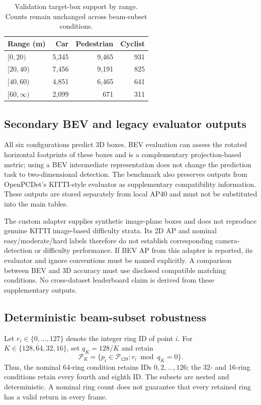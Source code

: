 \documentclass[10pt,twocolumn]{article}
\begin{document}
\begin{table}[t]
\centering\small
\caption{Validation target-box support by range. Counts remain unchanged across beam-subset conditions.}
\label{tab:support}
\begin{tabular}{lrrr}
\toprule
Range (m) & Car & Pedestrian & Cyclist\\
\midrule
$[0,20)$ & 5,345 & 9,465 & 931\\
$[20,40)$ & 7,456 & 9,191 & 825\\
$[40,60)$ & 4,851 & 6,465 & 641\\
$[60,\infty)$ & 2,099 & 671 & 311\\
\bottomrule
\end{tabular}
\end{table}

\subsection{Secondary BEV and legacy evaluator outputs}
All six configurations predict 3D boxes. BEV evaluation can assess the rotated horizontal footprints of these boxes and is a complementary projection-based metric; using a BEV intermediate representation does not change the prediction task to two-dimensional detection. The benchmark also preserves outputs from OpenPCDet's KITTI-style evaluator as supplementary compatibility information. These outputs are stored separately from local AP40 and must not be substituted into the main tables.

The custom adapter supplies synthetic image-plane boxes and does not reproduce genuine KITTI image-based difficulty strata. Its 2D AP and nominal easy/moderate/hard labels therefore do not establish corresponding camera-detection or difficulty performance. If BEV AP from this adapter is reported, its evaluator and ignore conventions must be named explicitly. A comparison between BEV and 3D accuracy must use disclosed compatible matching conditions. No cross-dataset leaderboard claim is derived from these supplementary outputs.

\subsection{Deterministic beam-subset robustness}
Let $r_i\in\{0,\ldots,127\}$ denote the integer ring ID of point $i$. For $K\in\{128,64,32,16\}$, set $q_K=128/K$ and retain
\begin{equation}
\mathcal{P}_K=\{p_i\in\mathcal{P}_{128}:r_i\bmod q_K=0\}.
\label{eq:beams}
\end{equation}
Thus, the nominal 64-ring condition retains IDs $0,2,\ldots,126$; the 32- and 16-ring conditions retain every fourth and eighth ID. The subsets are nested and deterministic. A nominal ring count does not guarantee that every retained ring has a valid return in every frame.
\end{document}
